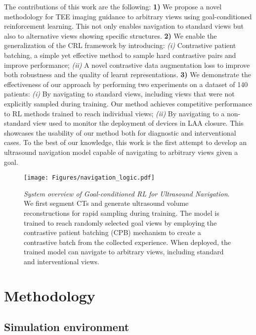 The contributions of this work are the following:
\textbf{1)} We propose a novel methodology for TEE imaging guidance to arbitrary views using goal-conditioned reinforcement learning. This not only enables navigation to standard views but also to alternative views showing specific structures. \textbf{2)} We enable the generalization of the CRL framework by introducing: \textit{(i)} Contrastive patient batching, a simple yet effective method to sample hard contrastive pairs and improve performance; \textit{(ii)} A novel contrastive data augmentation loss to improve both robustness and the quality of learnt representations. \textbf{3)} We demonstrate the effectiveness of our approach by performing two experiments on a dataset of 140 patients: \textit{(i)} By navigating to standard views, including views that were not explicitly sampled during training. Our method achieves competitive performance to RL methods trained to reach individual views; \textit{(ii)} By navigating to a non-standard view used to monitor the deployment of devices in LAA closure. This showcases the usability of our method both for diagnostic and interventional cases. To the best of our knowledge, this work is the first attempt to develop an ultrasound navigation model capable of navigating to arbitrary views given a goal.

\begin{figure}[t!]
\centering
\texttt{[image: Figures/navigation\_logic.pdf]}
\caption{\textit{System overview of Goal-conditioned RL for Ultrasound Navigation}. We first segment CTs and generate ultrasound volume reconstructions for rapid sampling during training. The model is trained to reach randomly selected goal views by employing the contrastive patient batching (CPB) mechanism to create a contrastive batch from the collected experience. When deployed, the trained model can navigate to arbitrary views, including standard and interventional views.} \label{fig:pipeline}
\end{figure}

\section{Methodology}

\subsection{Simulation environment}

